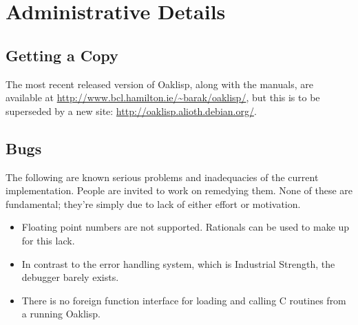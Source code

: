 %
%
%


\chapter{Administrative Details}

\section{Getting a Copy}

The most recent released version of Oaklisp, along with the manuals,
are available at \url{http://www.bcl.hamilton.ie/~barak/oaklisp/}, but
this is to be superseded by a new site:
\url{http://oaklisp.alioth.debian.org/}.

\section{Bugs}

The following are known serious problems and inadequacies of the
current implementation.  People are invited to work on remedying them.
None of these are fundamental; they're simply due to lack of either
effort or motivation.

\begin{itemize}
\item Floating point numbers are not supported.  Rationals can be
used to make up for this lack.

\item In contrast to the error handling system, which is Industrial
Strength, the debugger barely exists.

\item There is no foreign function interface for loading and calling
C routines from a running Oaklisp.

%
\end{itemize}

